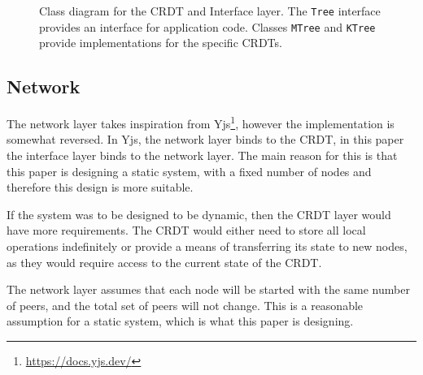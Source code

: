 \documentclass[12pt]{report}
\begin{document}
\begin{figure}[H]
    \centering
    \caption{Class diagram for the CRDT and Interface layer. The \texttt{Tree} interface provides an interface for application code. Classes \texttt{MTree} and \texttt{KTree} provide implementations for the specific CRDTs.}
    \label{fig:crdt}
\end{figure}

\subsection{Network}
The network layer takes inspiration from Yjs\footnote{\url{https://docs.yjs.dev/}}, however the implementation is somewhat reversed. In Yjs, the network layer binds to the CRDT, in this paper the interface layer binds to the network layer. The main reason for this is that this paper is designing a static system, with a fixed number of nodes and therefore this design is more suitable. \par

If the system was to be designed to be dynamic, then the CRDT layer would have more requirements. The CRDT would either need to store all local operations indefinitely or provide a means of transferring its state to new nodes, as they would require access to the current state of the CRDT.

The network layer assumes that each node will be started with the same number of peers, and the total set of peers will not change. This is a reasonable assumption for a static system, which is what this paper is designing. \par
\end{document}

